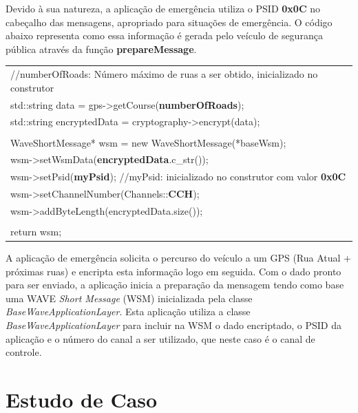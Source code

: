 \documentclass[
12pt,				%
openright,			%
oneside,			%
a4paper,			%
brazil,				%
]{abntex2}
\begin{document}
	\par Devido à sua natureza, a aplicação de emergência utiliza o PSID \textbf{0x0C} no cabeçalho das mensagens, apropriado para situações de emergência. O código abaixo representa como essa informação é gerada pelo veículo de segurança pública através da função \textbf{prepareMessage}. %

    \begin{table}[H] %
	    \centering
	    \renewcommand{\arraystretch}{1.2}
	    \begin{tabular}{|p{15cm}|}
		    \hline
		    //numberOfRoads: Número máximo de ruas a ser obtido, inicializado no construtor \\
            std::string data = gps->getCourse(\textbf{numberOfRoads}); \\
            std::string encryptedData = cryptography->encrypt(data); \\
            \\
            WaveShortMessage* wsm = new WaveShortMessage(*baseWsm); \\
            wsm->setWsmData(\textbf{encryptedData}.c\_str()); \\
            wsm->setPsid(\textbf{myPsid}); //myPsid: inicializado no construtor com valor \textbf{0x0C} \\
            wsm->setChannelNumber(Channels::\textbf{CCH}); \\
            wsm->addByteLength(encryptedData.size()); \\
            \\
            return wsm; \\
		    \hline
	    \end{tabular}
    \end{table}

    \par A aplicação de emergência solicita o percurso do veículo a um GPS (Rua Atual + próximas ruas) e encripta esta informação logo em seguida. Com o dado pronto para ser enviado, a aplicação inicia a preparação da mensagem tendo como base uma WAVE \textit{Short Message} (WSM) inicializada pela classe \textit{BaseWaveApplicationLayer}. Esta aplicação utiliza a classe \textit{BaseWaveApplicationLayer} para incluir na WSM o dado encriptado, o PSID da aplicação e o número do canal a ser utilizado, que neste caso é o canal de controle.


	\section{\label{sec:estudoDeCaso}Estudo de Caso}
\end{document}
